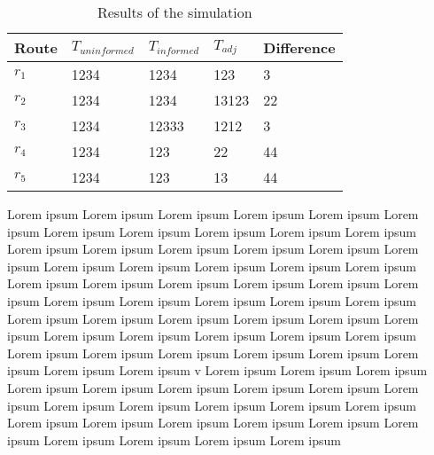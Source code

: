 \begin{table}[]
\centering
\begin{tabular}{lllll}
\textbf{Route} & \textbf{$T_{uninformed}$} & \textbf{$T_{informed}$} & \textbf{$T_{adj}$} & \textbf{Difference} \\ \hline
$r_1$          & 1234                      & 1234                    & 123                & 3                   \\
$r_2$          & 1234                      & 1234                    & 13123              & 22                  \\
$r_3$          & 1234                      & 12333                   & 1212               & 3                   \\
$r_4$          & 1234                      & 123                     & 22                 & 44                  \\
$r_5$          & 1234                      & 123                     & 13                 & 44                 
\end{tabular}
\caption{Results of the simulation}
\label{tab:eval-results}
\end{table}
Lorem ipsum Lorem ipsum Lorem ipsum Lorem ipsum Lorem ipsum Lorem ipsum Lorem ipsum Lorem ipsum Lorem ipsum Lorem ipsum Lorem ipsum Lorem ipsum Lorem ipsum Lorem ipsum Lorem ipsum Lorem ipsum Lorem ipsum Lorem ipsum Lorem ipsum Lorem ipsum Lorem ipsum Lorem ipsum Lorem ipsum Lorem ipsum Lorem ipsum Lorem ipsum Lorem ipsum Lorem ipsum Lorem ipsum Lorem ipsum Lorem ipsum Lorem ipsum Lorem ipsum Lorem ipsum Lorem ipsum Lorem ipsum Lorem ipsum Lorem ipsum Lorem ipsum Lorem ipsum Lorem ipsum Lorem ipsum Lorem ipsum Lorem ipsum Lorem ipsum Lorem ipsum Lorem ipsum Lorem ipsum Lorem ipsum Lorem ipsum Lorem ipsum Lorem ipsum v
Lorem ipsum Lorem ipsum Lorem ipsum Lorem ipsum Lorem ipsum Lorem ipsum Lorem ipsum Lorem ipsum Lorem ipsum Lorem ipsum Lorem ipsum Lorem ipsum Lorem ipsum Lorem ipsum Lorem ipsum Lorem ipsum Lorem ipsum Lorem ipsum Lorem ipsum Lorem ipsum Lorem ipsum Lorem ipsum Lorem ipsum Lorem ipsum 